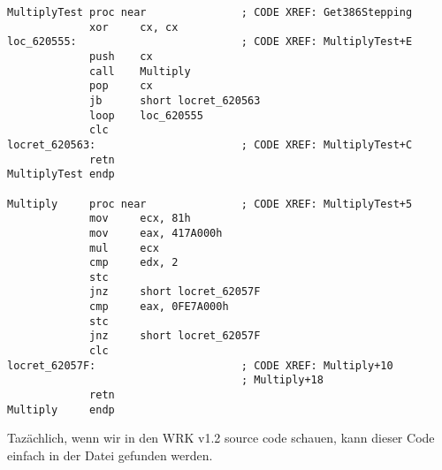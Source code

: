 \begin{lstlisting}[style=customasmx86]
MultiplyTest proc near               ; CODE XREF: Get386Stepping
             xor     cx, cx
loc_620555:                          ; CODE XREF: MultiplyTest+E
             push    cx
             call    Multiply
             pop     cx
             jb      short locret_620563
             loop    loc_620555
             clc
locret_620563:                       ; CODE XREF: MultiplyTest+C
             retn
MultiplyTest endp

Multiply     proc near               ; CODE XREF: MultiplyTest+5
             mov     ecx, 81h
             mov     eax, 417A000h
             mul     ecx
             cmp     edx, 2
             stc
             jnz     short locret_62057F
             cmp     eax, 0FE7A000h
             stc
             jnz     short locret_62057F
             clc
locret_62057F:                       ; CODE XREF: Multiply+10
                                     ; Multiply+18
             retn
Multiply     endp
\end{lstlisting}

Tazächlich, wenn wir in den 
\ac{WRK} v1.2 source code schauen,
kann dieser Code einfach in der Datei
 gefunden werden.

